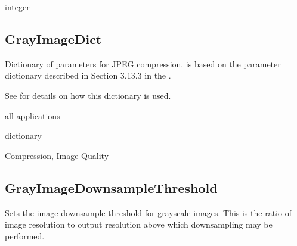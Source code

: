 \documentclass[letterpaper,12pt,english,openany,oneside]{sphinxmanual}
\begin{document}
integer

\label{\detokenize{PDF_Create_CommonSettings:default-value-39}}

\begin{sphinxVerbatim}[commandchars=\\\{\}]
\end{sphinxVerbatim}




\subsection{GrayImageDict}
\label{\detokenize{PDF_Create_CommonSettings:grayimagedict}}
Dictionary of parameters for JPEG compression.  is based on the  parameter dictionary described in Section 3.13.3 in the  .

See  for details on how this dictionary is used.

\label{\detokenize{PDF_Create_CommonSettings:supported-by-44}}

all applications

\label{\detokenize{PDF_Create_CommonSettings:type-44}}

dictionary

\label{\detokenize{PDF_Create_CommonSettings:ui-name-32}}

Compression, Image Quality

\label{\detokenize{PDF_Create_CommonSettings:default-value-40}}

\begin{sphinxVerbatim}[commandchars=\\\{\}]
   \PYG{p}{[}   \PYG{p}{]}  \PYG{p}{[}   \PYG{p}{]}
\end{sphinxVerbatim}




\subsection{GrayImageDownsampleThreshold}
\label{\detokenize{PDF_Create_CommonSettings:grayimagedownsamplethreshold}}
Sets the image downsample threshold for grayscale images. This is the ratio of image resolution to output resolution above which downsampling may be performed.
\end{document}
